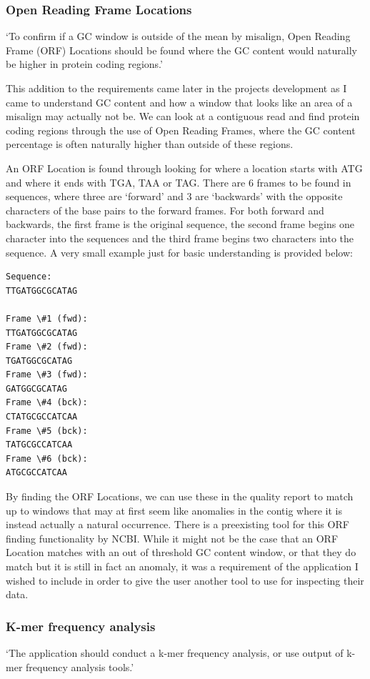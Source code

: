 \subsubsection{Open Reading Frame Locations}
`To confirm if a GC window is outside of the mean by misalign, Open Reading Frame (ORF) Locations should be found where the GC content would naturally be higher in protein coding regions.'

This addition to the requirements came later in the projects development as I came to understand GC content and how a window that looks like an area of a misalign may actually not be. We can look at a contiguous read and find protein coding regions through the use of Open Reading Frames\cite{orfdefinition}, where the GC content percentage is often naturally higher than outside of these regions.\cite{JEU:JEU239}

An ORF Location is found through looking for where a location starts with ATG and where it ends with TGA, TAA or TAG. There are 6 frames to be found in sequences, where three are `forward' and 3 are `backwards' with the opposite characters of the base pairs to the forward frames. For both forward and backwards, the first frame is the original sequence, the second frame begins one character into the sequences and the third frame begins two characters into the sequence. A very small example just for basic understanding is provided below:

\begin{verbatim}
Sequence:
TTGATGGCGCATAG

Frame \#1 (fwd):
TTGATGGCGCATAG
Frame \#2 (fwd):
TGATGGCGCATAG
Frame \#3 (fwd):
GATGGCGCATAG
Frame \#4 (bck):
CTATGCGCCATCAA
Frame \#5 (bck):
TATGCGCCATCAA
Frame \#6 (bck):
ATGCGCCATCAA
\end{verbatim}

By finding the ORF Locations, we can use these in the quality report to match up to windows that may at first seem like anomalies in the contig where it is instead actually a natural occurrence. There is a preexisting tool for this ORF finding functionality by NCBI\cite{orffinder}. While it might not be the case that an ORF Location matches with an out of threshold GC content window, or that they do match but it is still in fact an anomaly, it was a requirement of the application I wished to include in order to give the user another tool to use for inspecting their data.

\subsubsection{K-mer frequency analysis}
`The application should conduct a k-mer frequency analysis, or use output of k-mer frequency analysis tools.'

